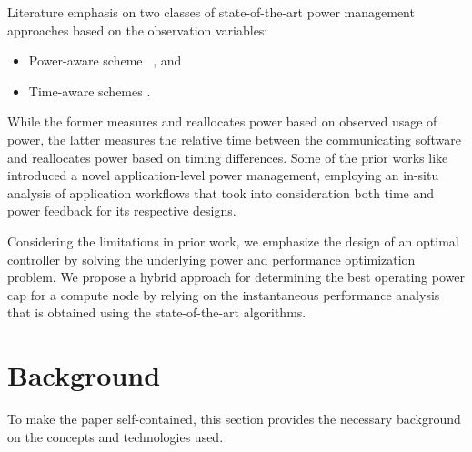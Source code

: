 

Literature emphasis on two classes of state-of-the-art power management approaches based on the observation variables:
\begin{itemize}
\item Power-aware scheme ~\cite{hsu2005power,patki2015practical}, and
\item Time-aware schemes \cite{sadrosadati2019itap,qiu2012three}.
\end{itemize}
While the former measures and reallocates power based on observed usage of power, the latter measures the relative time between the communicating software and reallocates power based on timing differences. Some of the prior works like \cite{9139791,tsujita2022classifying} introduced a novel application-level power management, employing an in-situ analysis of application workflows that took into consideration both time and power feedback for its respective designs. 
\fi 

Considering the limitations in prior work, we emphasize the design of an optimal controller by solving the underlying power and performance optimization problem.  We propose a hybrid approach for determining the best operating power cap for a compute node by relying on the instantaneous performance analysis that is obtained using the state-of-the-art algorithms.

\section{Background}\label{ch3:sec:Background}
To make the paper self-contained, this section provides the necessary background on the concepts and technologies used.
